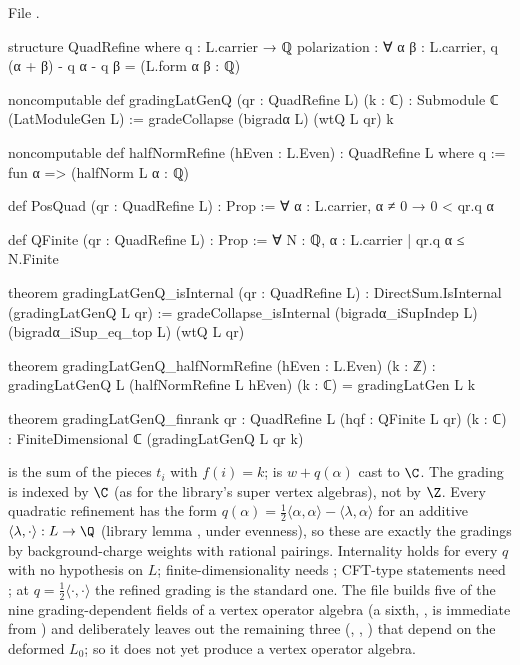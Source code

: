 \noindent File .
\begin{leancode}
structure QuadRefine where
  q : L.carrier → ℚ
  polarization : ∀ α β : L.carrier, q (α + β) - q α - q β = (L.form α β : ℚ)

noncomputable def gradingLatGenQ (qr : QuadRefine L) (k : ℂ) : Submodule ℂ (LatModuleGen L) :=
  gradeCollapse (bigradα L) (wtQ L qr) k

noncomputable def halfNormRefine (hEven : L.Even) : QuadRefine L where
  q := fun α => (halfNorm L α : ℚ)

def PosQuad (qr : QuadRefine L) : Prop := ∀ α : L.carrier, α ≠ 0 → 0 < qr.q α

def QFinite (qr : QuadRefine L) : Prop := ∀ N : ℚ, {α : L.carrier | qr.q α ≤ N}.Finite

theorem gradingLatGenQ_isInternal (qr : QuadRefine L) :
    DirectSum.IsInternal (gradingLatGenQ L qr) :=
  gradeCollapse_isInternal (bigradα_iSupIndep L) (bigradα_iSup_eq_top L) (wtQ L qr)

theorem gradingLatGenQ_halfNormRefine (hEven : L.Even) (k : ℤ) :
    gradingLatGenQ L (halfNormRefine L hEven) (k : ℂ) = gradingLatGen L k

theorem gradingLatGenQ_finrank {qr : QuadRefine L} (hqf : QFinite L qr) (k : ℂ) :
    FiniteDimensional ℂ (gradingLatGenQ L qr k)
\end{leancode}

\begin{dictionary}
 is the sum of the pieces $t_i$ with $f(i)=k$;  is $w+q(\alpha)$ cast to
$\C$. The grading is indexed by $\C$ (as for the library's super vertex algebras), not by $\Z$. Every quadratic
refinement has the form $q(\alpha)=\frac12\langle\alpha,\alpha\rangle-\langle\lambda,\alpha\rangle$ for an additive
$\langle\lambda,\cdot\rangle:L\to\Q$ (library lemma , under evenness), so these are exactly the
gradings by background-charge weights with rational pairings. Internality holds for every $q$ with no hypothesis on $L$;
finite-dimensionality needs ; CFT-type statements need ; at $q=\frac12\langle\cdot,\cdot\rangle$ the
refined grading is the standard one. The file builds five of the nine grading-dependent fields of a vertex operator
algebra (a sixth, , is immediate from ) and deliberately leaves out the remaining three (, , ) that
depend on the deformed $L_0$; so it does not yet produce a vertex operator algebra.
\end{dictionary}

